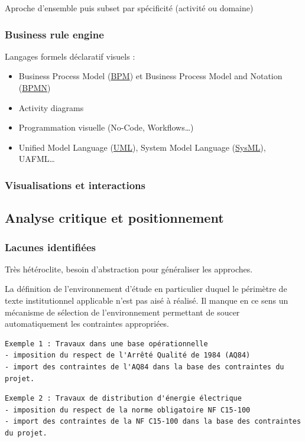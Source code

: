 \documentclass[a4paper,12pt]{article}
\begin{document}
Aproche d'ensemble puis subset par spécificité (activité ou domaine)
\subsubsection{Business rule engine}
\label{sec:org8049ed2}
Langages formels déclaratif visuels : 
\begin{itemize}
\item Business Process Model
 (\protect\hyperlink{gls-6}{\label{gls-6-use-1}BPM}) et Business Process Model and Notation
 (\protect\hyperlink{gls-7}{\label{gls-7-use-1}BPMN})
\item Activity diagrams
\item Programmation visuelle (No-Code, Workflows\ldots{})
\item Unified Model Language
 (\protect\hyperlink{gls-8}{\label{gls-8-use-1}UML}), System Model Language
 (\protect\hyperlink{gls-9}{\label{gls-9-use-1}SysML}), UAFML…
\end{itemize}
\subsubsection{Visualisations et interactions}
\label{sec:org3c95976}
\subsection{Analyse critique et positionnement}
\label{sec:org3b6d653}
\subsubsection{Lacunes identifiées}
\label{sec:org340a7e3}
Très hétéroclite, besoin d’abstraction pour généraliser les approches.

La définition de l'environnement d'étude en particulier duquel le périmètre de texte institutionnel applicable n'est pas aisé à réalisé.
Il manque en ce sens un mécanisme de sélection de l'environnement permettant de soucer automatiquement les contraintes appropriées.

\begin{verbatim}
Exemple 1 : Travaux dans une base opérationnelle
- imposition du respect de l'Arrêté Qualité de 1984 (AQ84)
- import des contraintes de l'AQ84 dans la base des contraintes du projet.
\end{verbatim}

\begin{verbatim}
Exemple 2 : Travaux de distribution d'énergie électrique
- imposition du respect de la norme obligatoire NF C15-100
- import des contraintes de la NF C15-100 dans la base des contraintes du projet.
\end{verbatim}
\end{document}
